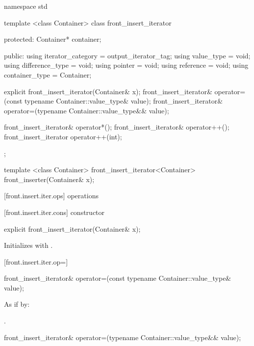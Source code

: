 %
\begin{codeblock}
namespace std {
  template <class Container>
  class front_insert_iterator {
  protected:
    Container* container;

  public:
    using iterator_category = output_iterator_tag;
    using value_type        = void;
    using difference_type   = void;
    using pointer           = void;
    using reference         = void;
    using container_type    = Container;

    explicit front_insert_iterator(Container& x);
    front_insert_iterator& operator=(const typename Container::value_type& value);
    front_insert_iterator& operator=(typename Container::value_type&& value);

    front_insert_iterator& operator*();
    front_insert_iterator& operator++();
    front_insert_iterator  operator++(int);
  };

  template <class Container>
    front_insert_iterator<Container> front_inserter(Container& x);
}
\end{codeblock}

[front.insert.iter.ops]{ operations}

[front.insert.iter.cons]{ constructor}

%
\begin{itemdecl}
explicit front_insert_iterator(Container& x);
\end{itemdecl}

\begin{itemdescr}
\pnum
\effects
Initializes
with .
\end{itemdescr}

[front.insert.iter.op=]{}

%
\begin{itemdecl}
front_insert_iterator& operator=(const typename Container::value_type& value);
\end{itemdecl}

\begin{itemdescr}
\pnum
\effects
As if by: 

\pnum
\returns
{}.
\end{itemdescr}

%
\begin{itemdecl}
front_insert_iterator& operator=(typename Container::value_type&& value);
\end{itemdecl}

